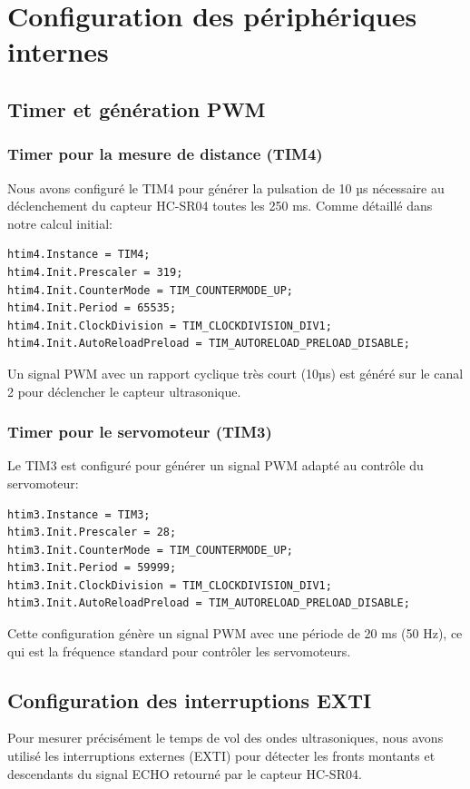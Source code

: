 \section{Configuration des périphériques internes}

\subsection{Timer et génération PWM}

\subsubsection{Timer pour la mesure de distance (TIM4)}
Nous avons configuré le TIM4 pour générer la pulsation de 10 µs nécessaire au déclenchement du capteur HC-SR04 toutes les 250 ms. Comme détaillé dans notre calcul initial:

\begin{lstlisting}[caption={Configuration du TIM4}, label={lst:tim4config}]
htim4.Instance = TIM4;
htim4.Init.Prescaler = 319;
htim4.Init.CounterMode = TIM_COUNTERMODE_UP;
htim4.Init.Period = 65535;
htim4.Init.ClockDivision = TIM_CLOCKDIVISION_DIV1;
htim4.Init.AutoReloadPreload = TIM_AUTORELOAD_PRELOAD_DISABLE;
\end{lstlisting}

Un signal PWM avec un rapport cyclique très court (10µs) est généré sur le canal 2 pour déclencher le capteur ultrasonique.

\subsubsection{Timer pour le servomoteur (TIM3)}
Le TIM3 est configuré pour générer un signal PWM adapté au contrôle du servomoteur:

\begin{lstlisting}[caption={Configuration du TIM3}, label={lst:tim3config}]
htim3.Instance = TIM3;
htim3.Init.Prescaler = 28;
htim3.Init.CounterMode = TIM_COUNTERMODE_UP;
htim3.Init.Period = 59999;
htim3.Init.ClockDivision = TIM_CLOCKDIVISION_DIV1;
htim3.Init.AutoReloadPreload = TIM_AUTORELOAD_PRELOAD_DISABLE;
\end{lstlisting}

Cette configuration génère un signal PWM avec une période de 20 ms (50 Hz), ce qui est la fréquence standard pour contrôler les servomoteurs.

\subsection{Configuration des interruptions EXTI}
Pour mesurer précisément le temps de vol des ondes ultrasoniques, nous avons utilisé les interruptions externes (EXTI) pour détecter les fronts montants et descendants du signal ECHO retourné par le capteur HC-SR04.


